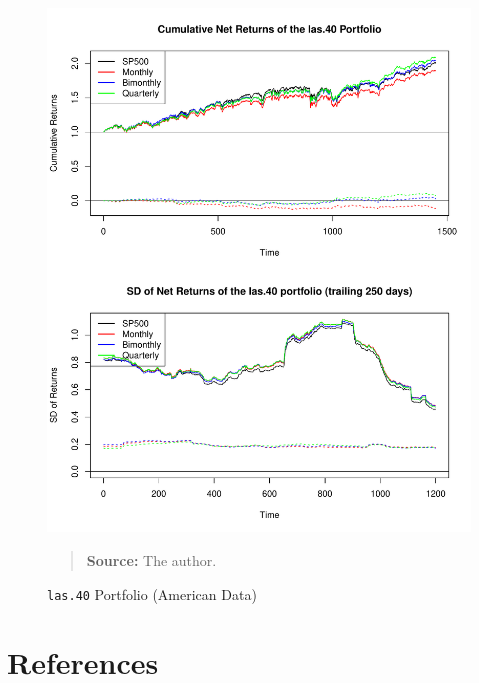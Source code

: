 \documentclass[preprint, doubleblind, authoryear,10pt]{elsarticle}
\begin{document}
\begin{figure}[htpb]
\centering
\footnotesize
\caption{\texttt{las.40} Portfolio (American Data)}
\label{fig:spy:las.40}
\includegraphics[width=.95\linewidth]{./figs/SP500-retac-las-40.pdf}
\begin{quote}
\textbf{Source:} The author.
\end{quote}
\end{figure}

\clearpage
\section*{References}

\end{document}
